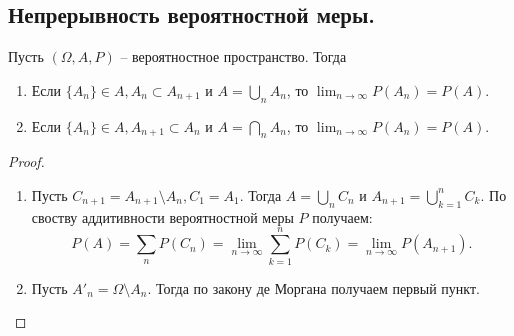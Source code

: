 \subsection{Непрерывность вероятностной меры.}
\begin{theorem}
    Пусть $(\Omega, A, P)$ -- вероятностное пространство. Тогда
    \begin{enumerate}
        \item Если $\{A_n\} \in A, A_n \subset A_{n+1}$ и $A = \bigcup_n A_n$, то $\lim_{n \to \infty} P(A_n) = P(A)$.
        \item Если $\{A_n\} \in A, A_{n+1} \subset A_n$ и $A = \bigcap_n A_n$, то $\lim_{n \to \infty} P(A_n) = P(A)$.
    \end{enumerate}
    \begin{proof}
        \text{}
        \begin{enumerate}
            \item Пусть $C_{n+1} = A_{n+1} \setminus A_n, C_1 = A_1$. Тогда $A = \bigcup_n C_n$ и $A_{n+1} = \bigcup_{k=1}^n C_k$. По своству аддитивности вероятностной меры $P$ получаем:
            \[
                P(A) = \sum_n P(C_n) = \lim_{n \to \infty} \sum_{k=1}^n P(C_k) = \lim_{n \to \infty} P(A_{n+1}).
            \]
            \item Пусть $A'_n = \Omega \setminus A_n$. Тогда по закону де Моргана получаем первый пункт.
        \end{enumerate}
    \end{proof}
\end{theorem}